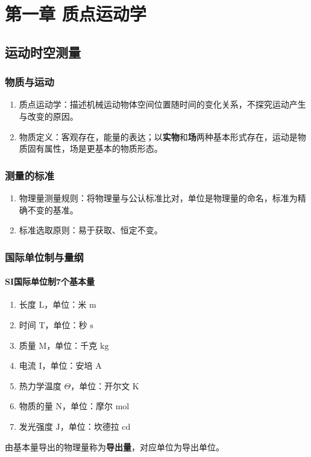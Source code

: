 \chapter{第一章 质点运动学}

\section{运动时空测量}
    \subsection{物质与运动}
    \begin{enumerate}
        \item 质点运动学：描述机械运动物体空间位置随时间的变化关系，不探究运动产生与改变的原因。
        \item 物质定义：客观存在，能量的表达；以\textbf{实物}和\textbf{场}两种基本形式存在，运动是物质固有属性，场是更基本的物质形态。
    \end{enumerate}

    \subsection{测量的标准}
    \begin{enumerate}
        \item 物理量测量规则：将物理量与公认标准比对，单位是物理量的命名，标准为精确不变的基准。
        \item 标准选取原则：易于获取、恒定不变。
    \end{enumerate}

    \subsection{国际单位制与量纲}
    \subsubsection{SI国际单位制7个基本量}
    \begin{enumerate}
        \item 长度 $\mathrm{L}$，单位：米 $\mathrm{m}$
        \item 时间 $\mathrm{T}$，单位：秒 $\mathrm{s}$
        \item 质量 $\mathrm{M}$，单位：千克 $\mathrm{kg}$
        \item 电流 $\mathrm{I}$，单位：安培 $\mathrm{A}$
        \item 热力学温度 $\varTheta$，单位：开尔文 $\mathrm{K}$
        \item 物质的量 $\mathrm{N}$，单位：摩尔 $\mathrm{mol}$
        \item 发光强度 $\mathrm{J}$，单位：坎德拉 $\mathrm{cd}$
    \end{enumerate}
    由基本量导出的物理量称为\textbf{导出量}，对应单位为导出单位。

